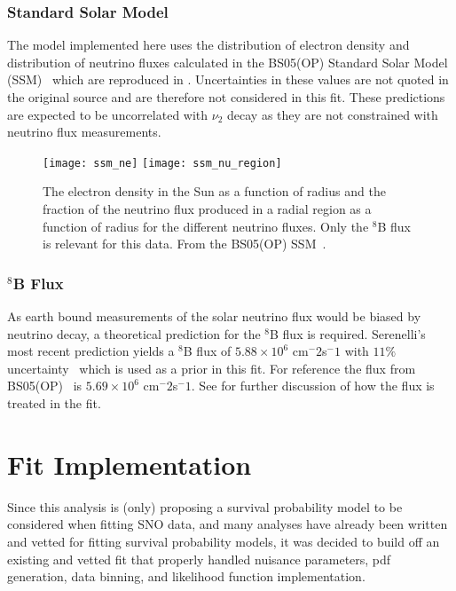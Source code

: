 \subsubsection{Standard Solar Model}

The model implemented here uses the distribution of electron density and distribution of neutrino fluxes calculated in the BS05(OP) Standard Solar Model (SSM)~\cite{bs05op} which are reproduced in . 
Uncertainties in these values are not quoted in the original source and are therefore not considered in this fit.
These predictions are expected to be uncorrelated with $\nu_2$ decay as they are not constrained with neutrino flux measurements.

\begin{figure}
\centering
\texttt{[image: ssm\_ne]}
\texttt{[image: ssm\_nu\_region]}
\caption{
The electron density in the Sun as a function of radius and the fraction of the neutrino flux produced in a radial region as a function of radius for the different neutrino fluxes. Only the $^8$B flux is relevant for this data. From the BS05(OP) SSM~\cite{bs05op}.
}
\label{fig:ssm}
\end{figure}

\subsubsection{$^8$B Flux}

As earth bound measurements of the solar neutrino flux would be biased by neutrino decay, a theoretical prediction for the $^8$B flux is required.
Serenelli's most recent prediction yields a $^8$B flux of $5.88\times10^{6}$ cm$^-2$s$^-1$ with $11\%$ uncertainty~\cite{serenelli} which is used as a prior in this fit.
For reference the flux from BS05(OP)~\cite{bs05op} is $5.69\times10^6$ cm$^-2$s$^-1$.
See  for further discussion of how the flux is treated in the fit.

\section{Fit Implementation}
\label{fit_impl}

Since this analysis is (only) proposing a survival probability model to be considered when fitting SNO data, and many analyses have already been written and vetted for fitting survival probability models, it was decided to build off an existing and vetted fit that properly handled nuisance parameters, pdf generation, data binning, and likelihood function implementation.

